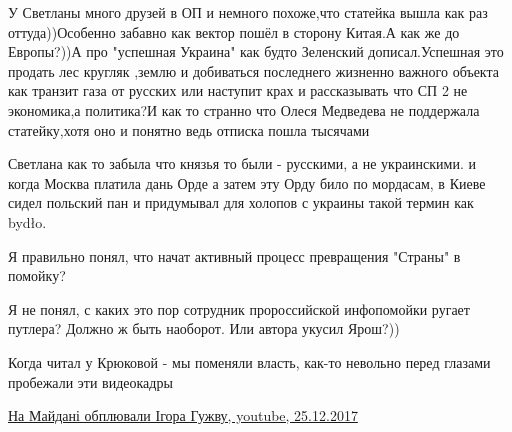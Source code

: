\begin{itemize}
У Светланы много друзей в ОП и немного похоже,что статейка вышла как раз
оттуда))Особенно забавно как вектор пошёл в сторону Китая.А как же до
Европы?))А про "успешная Украина" как будто Зеленский дописал.Успешная это
продать лес кругляк ,землю и добиваться последнего жизненно важного объекта как
транзит газа от русских или наступит крах и рассказывать что СП 2 не
экономика,а политика?И как то странно что Олеся Медведева не поддержала
статейку,хотя оно и понятно ведь отписка пошла тысячами


 

Светлана как то забыла что князья то были - русскими, а не украинскими. и когда
Москва платила дань Орде а затем эту Орду било по мордасам, в Киеве сидел
польский пан и придумывал для холопов с украины такой термин как bydło.

 
Я правильно понял, что начат активный процесс превращения "Страны" в помойку?

 
Я не понял, с каких это пор сотрудник пророссийской инфопомойки ругает путлера? Должно ж быть наоборот. Или автора укусил Ярош?))

 
Когда читал у Крюковой - мы поменяли власть, как-то невольно перед глазами пробежали эти видеокадры

\href{https://www.youtube.com/watch?v=YJztyd74998}{На Майдані обплювали Ігора Гужву, youtube, 25.12.2017}

 

\end{itemize}
